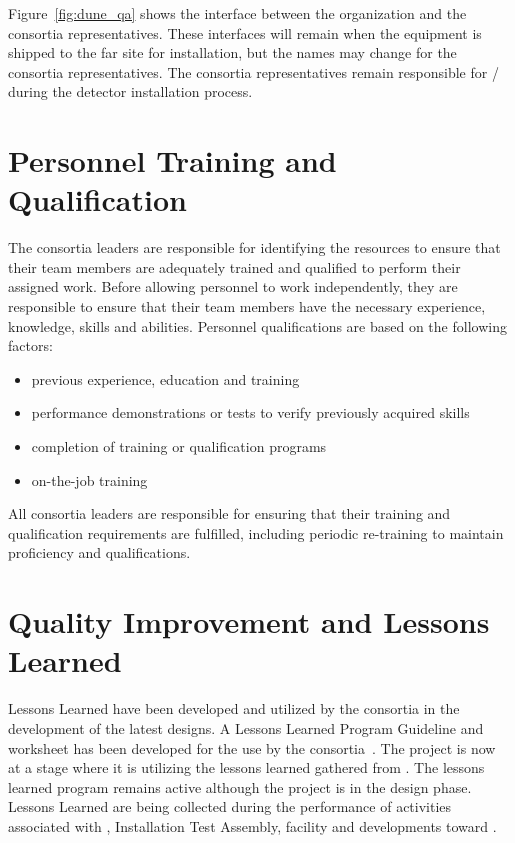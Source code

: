 Figure~\ref{fig:dune_qa} shows the interface between the
  organization and the consortia 
representatives.  These interfaces will remain when the equipment is
shipped to the far site for installation, but the names may change for
the consortia  representatives.  The consortia 
representatives remain responsible for / during the
detector installation process.


\section{Personnel Training and Qualification}

The  consortia leaders are responsible for identifying the
resources to ensure that their team members are adequately trained and
qualified to perform their assigned work. Before allowing personnel to
work independently, they are responsible to ensure that their team
members have the necessary experience, knowledge, skills and
abilities. Personnel qualifications are based on the following
factors:
\begin{itemize}
 \item previous experience, education and training
 \item performance demonstrations or tests to verify previously
   acquired skills
 \item completion of training or qualification programs
 \item on-the-job training
\end{itemize}

All  consortia leaders are responsible for ensuring that
their training and qualification requirements are fulfilled, including
periodic re-training to maintain proficiency and qualifications.


\section{Quality Improvement and Lessons Learned}
\label{sec:quality_improvement}

Lessons Learned have been developed and utilized by the consortia in
the development of the latest designs.  A Lessons Learned Program
Guideline and worksheet has been developed for the use by the
consortia~.  The project is now at a stage where it is
utilizing the lessons learned gathered from . The
lessons learned program remains active although the project is in the
design phase. Lessons Learned are being collected during the
performance of activities associated with ,
  Installation Test Assembly, 
\coldbox facility and developments toward .

